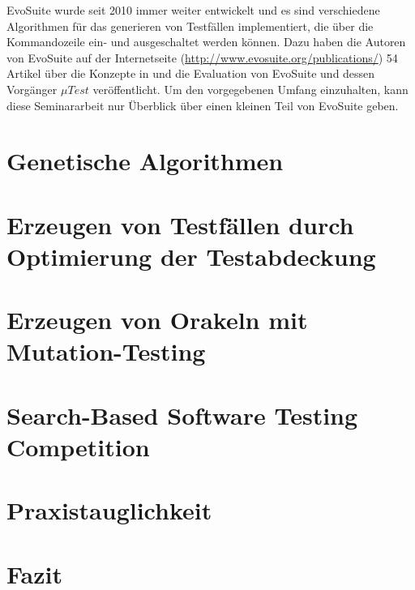 \documentclass[a4paper,11pt]{article}
\begin{document}
EvoSuite wurde seit 2010 immer weiter entwickelt und es sind verschiedene Algorithmen für das generieren von Testfällen implementiert, die über die Kommandozeile ein- und ausgeschaltet werden können.
Dazu haben die Autoren von EvoSuite auf der Internetseite (\url{http://www.evosuite.org/publications/}) 54 Artikel über die Konzepte in und die Evaluation von EvoSuite und dessen Vorgänger ${\mu}Test$ veröffentlicht.
Um den vorgegebenen Umfang einzuhalten, kann diese Seminararbeit nur Überblick über einen kleinen Teil von EvoSuite geben.

\section{Genetische Algorithmen}

\section{Erzeugen von Testfällen durch Optimierung der Testabdeckung}

\section{Erzeugen von Orakeln mit Mutation-Testing}

\section{Search-Based Software Testing Competition}

\section{Praxistauglichkeit}

\section{Fazit}



\end{document}
